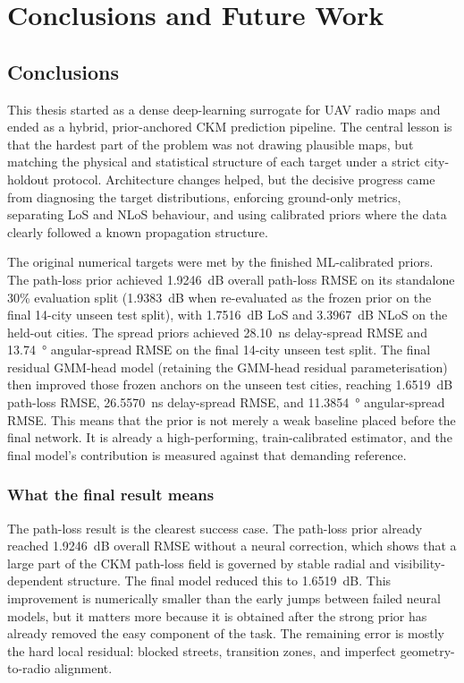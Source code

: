 \chapter{Conclusions and Future Work}

\section{Conclusions}

This thesis started as a dense deep-learning surrogate for UAV radio maps and
ended as a hybrid, prior-anchored CKM prediction pipeline. The central lesson is
that the hardest part of the problem was not drawing plausible maps, but
matching the physical and statistical structure of each target under a strict
city-holdout protocol. Architecture changes helped, but the decisive progress
came from diagnosing the target distributions, enforcing ground-only metrics,
separating LoS and NLoS behaviour, and using calibrated priors where the data
clearly followed a known propagation structure.

The original numerical targets were met by the finished ML-calibrated priors. The path-loss prior
achieved \SI{1.9246}{dB} overall path-loss RMSE on its standalone 30\%
evaluation split (\SI{1.9383}{dB} when re-evaluated as the frozen prior on the
final 14-city unseen test split), with \SI{1.7516}{dB} LoS and
\SI{3.3967}{dB} NLoS on the held-out cities. The spread priors achieved
\SI{28.10}{ns} delay-spread RMSE and \SI{13.74}{\degree} angular-spread RMSE
on the final 14-city unseen test split. The final residual GMM-head model
(retaining the GMM-head residual parameterisation) then improved those frozen
anchors on the unseen test cities, reaching \SI{1.6519}{dB} path-loss RMSE,
\SI{26.5570}{ns} delay-spread RMSE, and \SI{11.3854}{\degree}
angular-spread RMSE.
This means that the prior is not merely a weak baseline placed before the final
network. It is already a high-performing, train-calibrated estimator, and the
final model's contribution is measured against that demanding reference.

\subsection{What the final result means}

The path-loss result is the clearest success case. The path-loss prior already reached
\SI{1.9246}{dB} overall RMSE without a neural correction, which shows that a
large part of the CKM path-loss field is governed by stable radial and
visibility-dependent structure. The final model reduced this to \SI{1.6519}{dB}. This
improvement is numerically smaller than the early jumps between failed neural
models, but it matters more because it is obtained after the strong prior has
already removed the easy component of the task. The remaining error is mostly
the hard local residual: blocked streets, transition zones, and imperfect
geometry-to-radio alignment.

